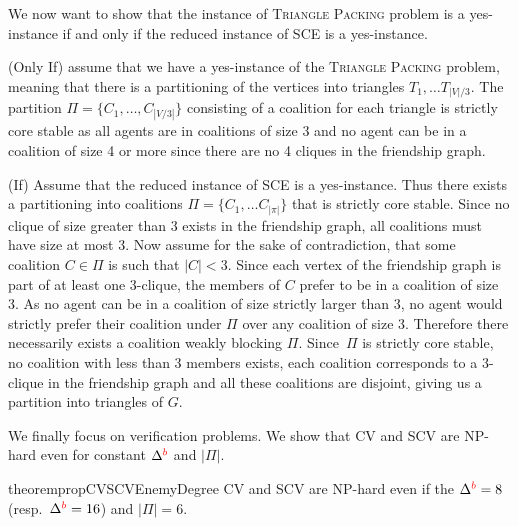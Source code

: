 \documentclass[a4paper,fleqn]{cas-sc}
\newcommand{\enemyColor}{red}
\newcommand{\agent}{agent\xspace}
\newcommand{\agents}{agents\xspace}
\newcommand{\partition}{\ensuremath{\Pi}\xspace}
\newcommand{\coalition}{\ensuremath{C}\xspace}
\newcommand{\enemySuperscript}{{\color{\enemyColor}b}}
\newcommand{\probname}[1]{\textsc{#1}}
\newcommand{\SCE}{SCE\xspace}
\newcommand{\SCV}{SCV\xspace}
\newcommand{\CV}{CV\xspace}
\newcommand{\maxDegree}{\ensuremath{\Delta}}
\newcommand{\maxDegreeEnemy}{\ensuremath{\maxDegree^{\enemySuperscript}}\xspace}
\newcommand{\maxNumberOfCoalitions}{\ensuremath{|\partition|}\xspace}
\newcommand{\appsymb}{$\star$}
\begin{document}
{We now want to show that the instance of \probname{Triangle Packing} problem is a yes-instance if and only if the reduced instance of \SCE is a yes-instance.

(Only If) assume that we have a yes-instance of the \probname{Triangle Packing} problem, meaning that there is a partitioning of the vertices into triangles $T_1,\dots T_{|V|/3}$. The partition $\partition=\{\coalition_1,\dots,\coalition_{|V/3|}\}$ consisting of a coalition for each triangle is strictly core stable as all \agents are in coalitions of size $3$ and no \agent can be in a coalition of size 4 or more since there are no 4 cliques in the friendship graph.

(If) Assume that the reduced instance of \SCE is a yes-instance. Thus there exists a partitioning into coalitions $\Pi=\{\coalition_1,\dots \coalition_{|\pi|}\}$ that is strictly core stable. Since no clique of size greater than 3 exists in the friendship graph, all coalitions must have size at most 3. Now assume for the sake of contradiction, that some coalition $\coalition \in \Pi$ is such that $|\coalition|<3$.
Since each vertex of the friendship graph is part of at least one 3-clique, the members of $\coalition$ prefer to be in a coalition of size 3. As no \agent can be in a coalition of size strictly larger than 3, no agent would strictly prefer their coalition under \partition over any coalition of size 3. Therefore there necessarily exists a coalition weakly blocking \partition. Since~\partition is strictly core stable, no coalition with less than 3 members exists, each coalition corresponds to a 3-clique in the friendship graph and all these coalitions are disjoint, giving us a partition into triangles of $G$.

}




We finally focus on verification problems.
We  show that \CV and \SCV are NP-hard even for constant \maxDegreeEnemy and \maxNumberOfCoalitions.

\begin{restatable}[\appsymb]{theorem}{propCVSCVEnemyDegree}
 \CV and \SCV are NP-hard even if the $\maxDegreeEnemy=8$ (resp.\ $\maxDegreeEnemy=16$) and $\maxNumberOfCoalitions=6$.
    \label{prop:CV_SCV_DegreeEnemy}
\end{restatable}
\end{document}
